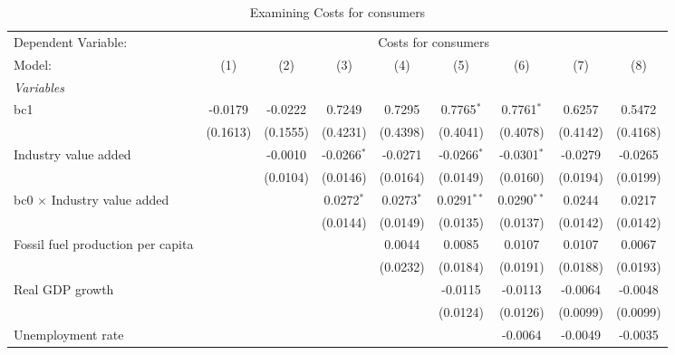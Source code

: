 
\begin{table}[htbp]
   \caption{Examining Costs for consumers}
   \centering
   \begin{tabular}{lcccccccc}
      \tabularnewline \midrule \midrule
      Dependent Variable: & \multicolumn{8}{c}{Costs for consumers}\\
      Model:                                  & (1)      & (2)      & (3)           & (4)          & (5)           & (6)           & (7)      & (8)\\  
      \midrule
      \emph{Variables}\\
      bc1                                     & -0.0179  & -0.0222  & 0.7249        & 0.7295       & 0.7765$^{*}$  & 0.7761$^{*}$  & 0.6257   & 0.5472\\   
                                              & (0.1613) & (0.1555) & (0.4231)      & (0.4398)     & (0.4041)      & (0.4078)      & (0.4142) & (0.4168)\\   
      Industry value added                    &          & -0.0010  & -0.0266$^{*}$ & -0.0271      & -0.0266$^{*}$ & -0.0301$^{*}$ & -0.0279  & -0.0265\\   
                                              &          & (0.0104) & (0.0146)      & (0.0164)     & (0.0149)      & (0.0160)      & (0.0194) & (0.0199)\\   
      bc0 $\times$ Industry value added       &          &          & 0.0272$^{*}$  & 0.0273$^{*}$ & 0.0291$^{**}$ & 0.0290$^{**}$ & 0.0244   & 0.0217\\   
                                              &          &          & (0.0144)      & (0.0149)     & (0.0135)      & (0.0137)      & (0.0142) & (0.0142)\\   
      Fossil fuel production per capita       &          &          &               & 0.0044       & 0.0085        & 0.0107        & 0.0107   & 0.0067\\   
                                              &          &          &               & (0.0232)     & (0.0184)      & (0.0191)      & (0.0188) & (0.0193)\\   
      Real GDP growth                         &          &          &               &              & -0.0115       & -0.0113       & -0.0064  & -0.0048\\   
                                              &          &          &               &              & (0.0124)      & (0.0126)      & (0.0099) & (0.0099)\\   
      Unemployment rate                       &          &          &               &              &               & -0.0064       & -0.0049  & -0.0035\\   

\end{tabular}
\end{table}
